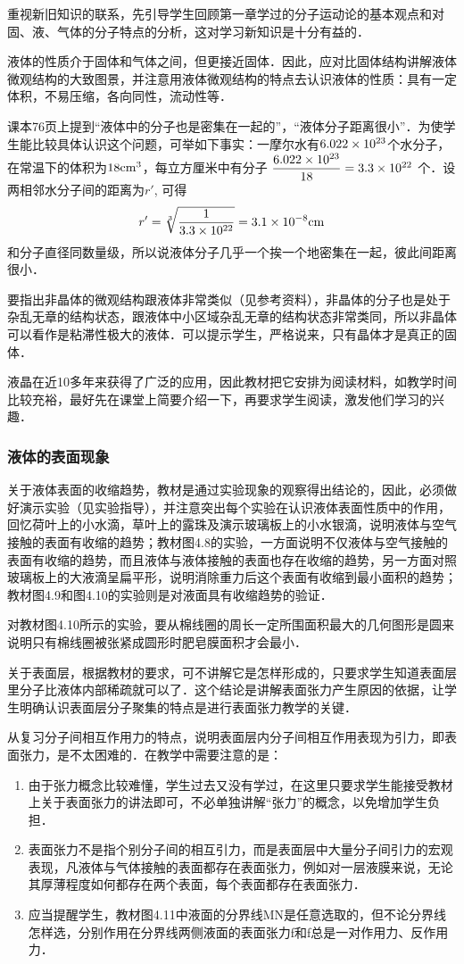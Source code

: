 重视新旧知识的联系，先引导学生回顾第一章学过的分子运动论的基本观点和对固、液、气体的分子特点的分析，这对学习新知识是十分有益的．

液体的性质介于固体和气体之间，但更接近固体．因此，应对比固体结构讲解液体微观结构的大致图景，并注意用液体微观结构的特点去认识液体的性质：具有一定体积，不易压缩，各向同性，流动性等．

课本76页上提到“液体中的分子也是密集在一起的”，“液体分子距离很小”．为使学生能比较具体认识这个问题，可举如下事实：一摩尔水有$6.022\times10^{23}$个水分子，在常温下的体积为$18{\rm cm^3}$，每立方厘米中有分子
$\dfrac{6.022\times10^{23}}{18}=3.3\times10^{22}$
个．设两相邻水分子间的距离为$r'$, 可得
\[r'=\sqrt[3]{\frac{1}{3.3\times10^{22}}}=3.1\times 10^{-8}{\rm cm}\]
和分子直径同数量级，所以说液体分子几乎一个挨一个地密集在一起，彼此间距离很小．

要指出非晶体的微观结构跟液体非常类似（见参考资料），非晶体的分子也是处于杂乱无章的结构状态，跟液体中小区域杂乱无章的结构状态非常类同，所以非晶体可以看作是粘滞性极大的液体．可以提示学生，严格说来，只有晶体才是真正的固体．

液晶在近10多年来获得了广泛的应用，因此教材把它安排为阅读材料，如教学时间比较充裕，最好先在课堂上简要介绍一下，再要求学生阅读，激发他们学习的兴趣．

\subsubsection{液体的表面现象}

关于液体表面的收缩趋势，教材是通过实验现象的观察得出结论的，因此，必须做好演示实验（见实验指导），并注意突出每个实验在认识液体表面性质中的作用，回忆荷叶上的小水滴，草叶上的露珠及演示玻璃板上的小水银滴，说明液体与空气接触的表面有收缩的趋势；教材图4.8的实验，一方面说明不仅液体与空气接触的表面有收缩的趋势，而且液体与液体接触的表面也存在收缩的趋势，另一方面对照玻璃板上的大液滴呈扁平形，说明消除重力后这个表面有收缩到最小面积的趋势；教材图4.9和图4.10的实验则是对液面具有收缩趋势的验证．

对教材图4.10所示的实验，要从棉线圈的周长一定所围面积最大的几何图形是圆来说明只有棉线圈被张紧成圆形时肥皂膜面积才会最小．

关于表面层，根据教材的要求，可不讲解它是怎样形成的，只要求学生知道表面层里分子比液体内部稀疏就可以了．这个结论是讲解表面张力产生原因的依据，让学生明确认识表面层分子聚集的特点是进行表面张力教学的关键．

从复习分子间相互作用力的特点，说明表面层内分子间相互作用表现为引力，即表面张力，是不太困难的．在教学中需要注意的是：
\begin{enumerate}
    \item 由于张力概念比较难懂，学生过去又没有学过，在这里只要求学生能接受教材上关于表面张力的讲法即可，不必单独讲解“张力”的概念，以免增加学生负担．
    \item 表面张力不是指个别分子间的相互引力，而是表面层中大量分子间引力的宏观表现，凡液体与气体接触的表面都存在表面张力，例如对一层液膜来说，无论其厚薄程度如何都存在两个表面，每个表面都存在表面张力．
    \item 应当提醒学生，教材图4.11中液面的分界线MN是任意选取的，但不论分界线怎样选，分别作用在分界线两侧液面的表面张力f和f总是一对作用力、反作用力．
\end{enumerate}

